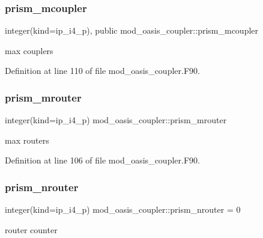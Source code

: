 \subsubsection{\texorpdfstring{prism\+\_\+mcoupler}{prism\_mcoupler}}
{\footnotesize\ttfamily integer(kind=ip\+\_\+i4\+\_\+p), public mod\+\_\+oasis\+\_\+coupler\+::prism\+\_\+mcoupler}



max couplers 



Definition at line 110 of file mod\+\_\+oasis\+\_\+coupler.\+F90.

\mbox{\label{namespacemod__oasis__coupler_a6d46883e9df70ab9cdafaf607afacacb}} 
\subsubsection{\texorpdfstring{prism\+\_\+mrouter}{prism\_mrouter}}
{\footnotesize\ttfamily integer(kind=ip\+\_\+i4\+\_\+p) mod\+\_\+oasis\+\_\+coupler\+::prism\+\_\+mrouter\hspace{0.3cm}{\ttfamily [private]}}



max routers 



Definition at line 106 of file mod\+\_\+oasis\+\_\+coupler.\+F90.

\mbox{\label{namespacemod__oasis__coupler_a2ebdb255598e1b004de2533f16b06e04}} 
\subsubsection{\texorpdfstring{prism\+\_\+nrouter}{prism\_nrouter}}
{\footnotesize\ttfamily integer(kind=ip\+\_\+i4\+\_\+p) mod\+\_\+oasis\+\_\+coupler\+::prism\+\_\+nrouter = 0\hspace{0.3cm}{\ttfamily [private]}}



router counter 



